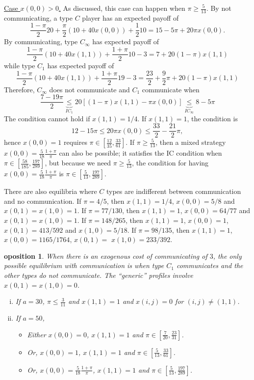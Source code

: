 \documentclass[12pt]{article}
\newtheorem{proposition}{\text{Pr}oposition}
\theoremstyle{definition}
\theoremstyle{remark}
\begin{document}
\underline{Case $x(0,0)>0$.} As discussed, this case can happen when $\pi\geq \frac{5}{13}$. By not communicating, a type $C$ player has an expected payoff of
\[
\frac{1-\pi}{2}20+\frac{\pi}{2}(10+40x(0,0))+\frac{1}{2}10=15-5\pi+20\pi x(0,0).
\]
By communicating, type $C_\infty$ has expected payoff of 
\[
\frac{1-\pi}{2}(10+40x(1,1))+\frac{1+\pi}{2}10-3=7 +20(1-\pi)x(1,1)
\]
while type $C_1$ has expected payoff of
\[
\frac{1-\pi}{2}(10+40x(1,1))+\frac{1+\pi}{2}19-3=\frac{23}{2}+\frac{9}{2}\pi +20(1-\pi)x(1,1)
\]
Therefore, $C_\infty$ does not communicate and $C_1$ communicate when
\[
\frac{7-19 \pi}{2}\underbrace{\leq}_{IC_1} 20\left[(1-\pi)x(1,1)-\pi x(0,0)\right]\underbrace{\leq}_{IC_\infty} 8-5\pi
\]
The condition cannot hold if $x(1,1)=1/4$. If $x(1,1)=1$, the condition is 
\[
12-15\pi\leq 20 \pi x(0,0) \leq \frac{33}{2}-\frac{21}{2}\pi,
\]
hence $x(0,0)=1$ requires $\pi\in\left[\frac{12}{35},\frac{33}{61}\right]$. If $\pi\geq \frac{5}{13}$, then a mixed strategy $x(0,0)=\frac{5}{18}\frac{1+\pi}{\pi}$ can also be possible; it satisfies the IC condition when $\pi\in \left[\frac{58}{185},\frac{197}{289}\right]$, but because we need $\pi\geq \frac{5}{13}$, the condition for having $x(0,0)=\frac{5}{18}\frac{1+\pi}{\pi}$ is $\pi\in \left[\frac{5}{13},\frac{197}{289}\right]$.

There are also equilibria where $C$ types are indifferent between communication and no communication. If $\pi=4/5$, then $x(1,1)=1/4$, $x(0,0)=5/8$ and $x(0,1)=x(1,0)=1$. If $\pi=77/130$, then $x(1,1)=1$, $x(0,0)=64/77$ and $x(0,1)=x(1,0)=1$. If $\pi=148/265$, then $x(1,1)=1$, $x(0,0)=1$, $x(0,1)=413/592$ and $x(1,0)=5/18$. If $\pi=98/135$, then $x(1,1)=1$, $x(0,0)=1165/1764$, $x(0,1)=$ $x(1,0)=233/392$.

\begin{proposition}\label{prop:F}
	When there is an exogenous cost of communicating of $3$, the only possible equilibrium with communication is when type $C_1$ communicates and the other types do not communicate. The ``generic'' profiles involve $x(0,1)=x(1,0)=0$.
	\begin{enumerate}[(i)]
		\item If $a=30$, $\pi\leq \frac{3}{11}$ and  $x(1,1)=1$ and $x(i,j)=0$ for $(i,j)\neq (1,1)$.
		\item If $a=50$, 
		\begin{itemize}
			\item Either  $x(0,0)=0$, $x(1,1)=1$ and $\pi\in\left[\frac{7}{20},\frac{23}{31}\right]$.
			\item Or, $x(0,0)=1$, $x(1,1)=1$ and $\pi\in\left[\frac{5}{13},\frac{33}{61}\right]$.
			\item Or, $x(0,0)=\frac{5}{18}\frac{1+\pi}{\pi}$, $x(1,1)=1$ and $\pi\in\left[\frac{5}{13},\frac{197}{289}\right]$.
		\end{itemize}
	\end{enumerate}
\end{proposition}
%
\end{document}
